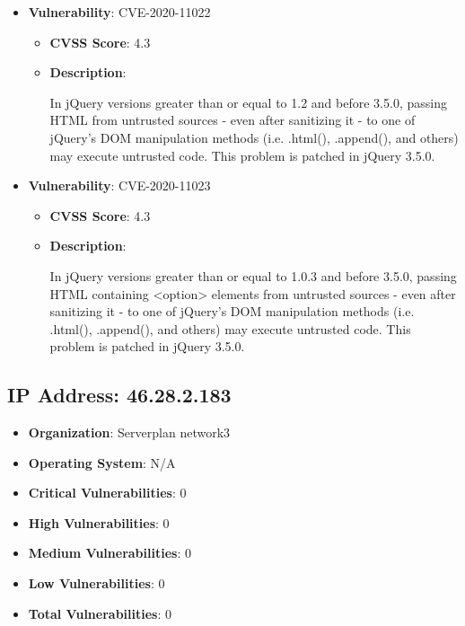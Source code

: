 \documentclass{article}
\begin{document}
\begin{itemize}
        \item \textbf{Vulnerability}: CVE-2020-11022
        \begin{itemize}
            \item \textbf{CVSS Score}:  4.3 
            \item \textbf{Description}:
            \parbox[t]{0.9\linewidth}{
                \ttfamily In jQuery versions greater than or equal to 1.2 and before 3.5.0, passing HTML from untrusted sources - even after sanitizing it - to one of jQuery's DOM manipulation methods (i.e. .html(), .append(), and others) may execute untrusted code. This problem is patched in jQuery 3.5.0.
            }
        \end{itemize}
    
        \item \textbf{Vulnerability}: CVE-2020-11023
        \begin{itemize}
            \item \textbf{CVSS Score}:  4.3 
            \item \textbf{Description}:
            \parbox[t]{0.9\linewidth}{
                \ttfamily In jQuery versions greater than or equal to 1.0.3 and before 3.5.0, passing HTML containing <option> elements from untrusted sources - even after sanitizing it - to one of jQuery's DOM manipulation methods (i.e. .html(), .append(), and others) may execute untrusted code. This problem is patched in jQuery 3.5.0.
            }
        \end{itemize}
    
\end{itemize}




\clearpage



\subsection*{IP Address: 46.28.2.183}

\begin{itemize}
    \item \textbf{Organization}: Serverplan network3
    \item \textbf{Operating System}:  N/A 
    \item \textbf{Critical Vulnerabilities}: 0
    \item \textbf{High Vulnerabilities}: 0
    \item \textbf{Medium Vulnerabilities}: 0
    \item \textbf{Low Vulnerabilities}: 0
    \item \textbf{Total Vulnerabilities}: 0
\end{itemize}
\end{document}
